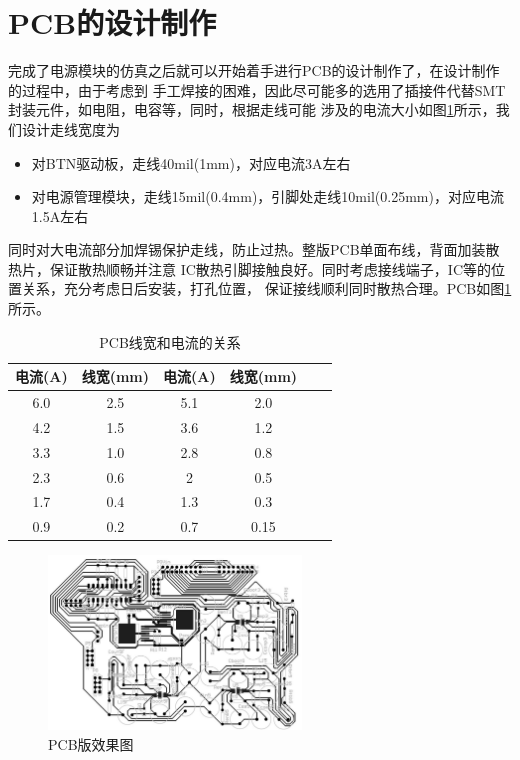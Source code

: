 \documentclass[a4paper]{paper}
\begin{document}
\section{PCB的设计制作}
完成了电源模块的仿真之后就可以开始着手进行PCB的设计制作了，在设计制作的过程中，由于考虑到
手工焊接的困难，因此尽可能多的选用了插接件代替SMT封装元件，如电阻，电容等，同时，根据走线可能
涉及的电流大小如图\ref{fig4}所示，我们设计走线宽度为
\begin{itemize}
    \item 对BTN驱动板，走线40mil(1mm)，对应电流3A左右
    \item 对电源管理模块，走线15mil(0.4mm)，引脚处走线10mil(0.25mm)，对应电流1.5A左右
\end{itemize}
同时对大电流部分加焊锡保护走线，防止过热。整版PCB单面布线，背面加装散热片，保证散热顺畅并注意
IC散热引脚接触良好。同时考虑接线端子，IC等的位置关系，充分考虑日后安装，打孔位置，
保证接线顺利同时散热合理。PCB如图\ref{pcb}所示。
\begin{table}
    \centering
    \caption{PCB线宽和电流的关系}
    \label{fig4}
    \begin{tabular}{|c|c|c|c|c|c|} \hline
        电流(A)&线宽(mm)&电流(A)&线宽(mm)\\ \hline
        6.0&2.5&5.1&2.0\\ \hline
        4.2&1.5&3.6&1.2\\ \hline
        3.3&1.0&2.8&0.8\\ \hline
        2.3&0.6&2&0.5\\ \hline
        1.7&0.4&1.3&0.3\\ \hline
        0.9&0.2&0.7&0.15\\ \hline
    \end{tabular}
\end{table}
\begin{figure}
    \centering
    \includegraphics[width = 0.6\textwidth]{pcb_fin.jpg}
    \caption{PCB版效果图}
    \label{pcb}
\end{figure}
\end{document}
